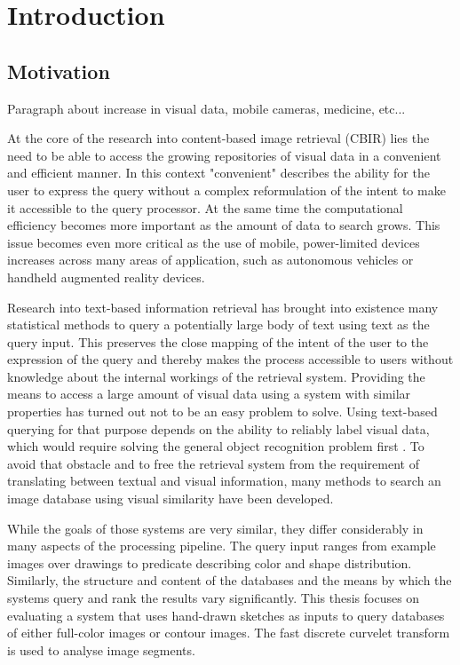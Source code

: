 \chapter{Introduction}\label{ch:introduction}

\section{Motivation}

Paragraph about increase in visual data, mobile cameras, medicine, etc...

At the core of the research into content-based image retrieval (CBIR) lies the
need to be able to access the growing repositories of visual data in a
convenient and efficient manner.  In this context "convenient" describes the
ability for the user to express the query without a complex reformulation of
the intent to make it accessible to the query processor. At the same time the
computational efficiency becomes more important as the amount of data to search
grows. This issue becomes even more critical as the use of mobile,
power-limited devices increases across many areas of application, such as
autonomous vehicles or handheld augmented reality devices.

Research into text-based information retrieval has brought into existence many
statistical methods to query a potentially large body of text using text as the
query input. This preserves the close mapping of the intent of the user to the
expression of the query and thereby makes the process accessible to users
without knowledge about the internal workings of the retrieval system.
Providing the means to access a large amount of visual data using a system with
similar properties has turned out not to be an easy problem to solve. Using
text-based querying for that purpose depends on the ability to reliably label
visual data, which would require solving the general object recognition problem
first \autocite{smeulders_content-based_2000}. To avoid that obstacle and to
free the retrieval system from the requirement of translating between textual
and visual information, many methods to search an image database using visual
similarity have been developed.

While the goals of those systems are very similar, they differ considerably in
many aspects of the processing pipeline. The query input ranges from example
images over drawings to predicate describing color and shape distribution.
Similarly, the structure and content of the databases and the means by which
the systems query and rank the results vary significantly. This thesis focuses
on evaluating a system that uses hand-drawn sketches as inputs to query
databases of either full-color images or contour images. The fast discrete
curvelet transform \autocite{candes_fast_2006} is used to analyse image
segments.


